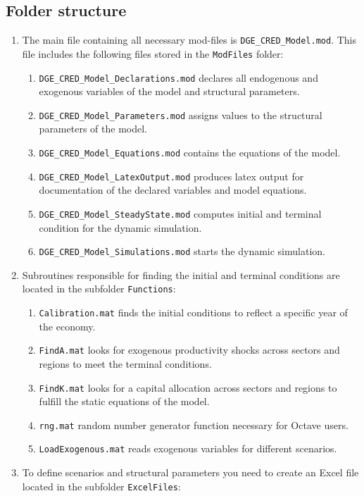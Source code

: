 \documentclass[10pt,a4paper]{article}
\begin{document}
\subsection{Folder structure}
\begin{enumerate}
\item The main file containing all necessary mod-files is {\tt DGE_CRED_Model.mod}. This file includes the following files stored in the {\tt ModFiles} folder:
\begin{enumerate}
\item {\tt DGE_CRED_Model_Declarations.mod} declares all endogenous and exogenous variables of the model and structural parameters.
\item {\tt DGE_CRED_Model_Parameters.mod} assigns values to the structural parameters of the model.
\item {\tt DGE_CRED_Model_Equations.mod} contains the equations of the model.
\item {\tt DGE_CRED_Model_LatexOutput.mod} produces latex output for documentation of the declared variables and model equations.
\item {\tt DGE_CRED_Model_SteadyState.mod} computes initial and terminal condition for the dynamic simulation.
\item {\tt DGE_CRED_Model_Simulations.mod} starts the dynamic simulation.
\end{enumerate}
\item Subroutines responsible for finding the initial and terminal conditions are located in the subfolder {\tt Functions}:
\begin{enumerate}
\item {\tt Calibration.mat} finds the initial conditions to reflect a specific year of the economy.
\item {\tt FindA.mat} looks for exogenous productivity shocks across sectors and regions to meet the terminal conditions.
\item {\tt FindK.mat} looks for a capital allocation across sectors and regions to fulfill the static equations of the model.
\item {\tt rng.mat} random number generator function necessary for Octave users.
\item {\tt LoadExogenous.mat} reads exogenous variables for different scenarios.
\end{enumerate}
\item To define scenarios and structural parameters you need to create an Excel file located in the subfolder {\tt ExcelFiles}:
\begin{enumerate}

\end{enumerate}
\end{enumerate}
\end{document}
